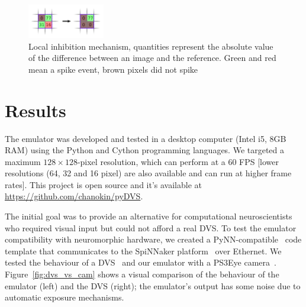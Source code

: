\documentclass[conference]{IEEEtran}
\begin{document}
\begin{figure}[htb]
\centering
    \includegraphics[width=0.3\textwidth]{inh_local_max_img}
    \caption{Local inhibition mechanism, quantities represent the absolute value of the difference between an image and the reference. Green and red mean a spike event, brown pixels did not spike}

  \label{fig:local_inh}
\end{figure}

\section{Results}
\label{sec:results}
The emulator was developed and tested in a desktop computer (Intel i5, 8GB RAM) using the Python and Cython programming languages. We targeted a maximum $128\times 128$-pixel resolution, which can perform at a 60 FPS [lower resolutions (64, 32 and 16 pixel) are also available and can run at higher frame rates]. This project is open source and it's available at \url{https://github.com/chanokin/pyDVS}.

The initial goal was to provide an alternative for computational neuroscientists who required visual input but could not afford a real DVS. To test the emulator compatibility with neuromorphic hardware, we created a PyNN-compatible~\cite{pynn} code template that communicates to the SpiNNaker platform~\cite{spinnakerOverview} over Ethernet. We tested the behaviour of a DVS~\cite{bernabeDVS} and our emulator with a PS3Eye camera~\cite{wikipedia:ps3eye}. Figure~\ref{fig:dvs_vs_cam} shows a visual comparison of the behaviour of the emulator (left) and the DVS (right); the emulator's output has some noise due to automatic exposure mechanisms. 
\end{document}
